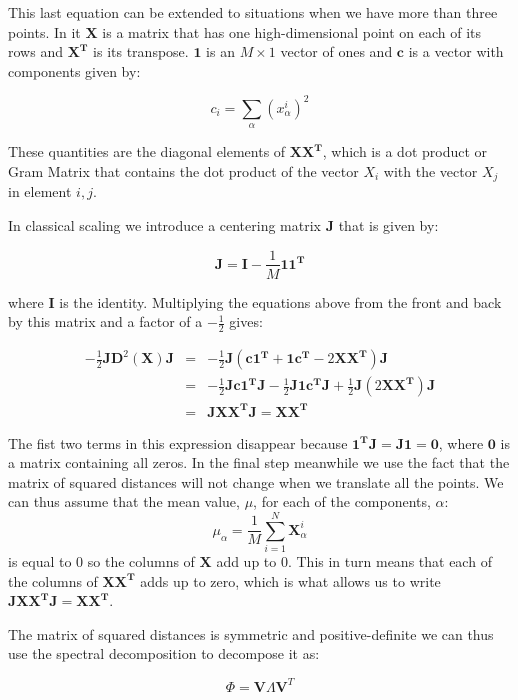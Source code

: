 This last equation can be extended to situations when we have more than three points. In it $\mathbf{X}$ is a matrix that has one high-\/dimensional point on each of its rows and $\mathbf{X^T}$ is its transpose. $\mathbf{1}$ is an $M \times 1$ vector of ones and $\mathbf{c}$ is a vector with components given by\+:

\[ c_i = \sum_\alpha (x_\alpha^i)^2 \]

These quantities are the diagonal elements of $\mathbf{X X^T}$, which is a dot product or Gram Matrix that contains the dot product of the vector $X_i$ with the vector $X_j$ in element $i,j$.

In classical scaling we introduce a centering matrix $\mathbf{J}$ that is given by\+:

\[ \mathbf{J} = \mathbf{I} - \frac{1}{M} \mathbf{11^T} \]

where $\mathbf{I}$ is the identity. Multiplying the equations above from the front and back by this matrix and a factor of a $-\frac{1}{2}$ gives\+:

\begin{eqnarray*} -\frac{1}{2} \mathbf{J} \mathbf{D}^2(\mathbf{X}) \mathbf{J} &=& -\frac{1}{2}\mathbf{J}( \mathbf{c 1^T} + \mathbf{1 c^T} - 2\mathbf{X X^T})\mathbf{J} \\ &=& -\frac{1}{2}\mathbf{J c 1^T J} - \frac{1}{2} \mathbf{J 1 c^T J} + \frac{1}{2} \mathbf{J}(2\mathbf{X X^T})\mathbf{J} \\ &=& \mathbf{ J X X^T J } = \mathbf{X X^T } \label{eqn:scaling} \end{eqnarray*}

The fist two terms in this expression disappear because $\mathbf{1^T J}=\mathbf{J 1} =\mathbf{0}$, where $\mathbf{0}$ is a matrix containing all zeros. In the final step meanwhile we use the fact that the matrix of squared distances will not change when we translate all the points. We can thus assume that the mean value, $\mu$, for each of the components, $\alpha$\+: \[ \mu_\alpha = \frac{1}{M} \sum_{i=1}^N \mathbf{X}^i_\alpha \] is equal to 0 so the columns of $\mathbf{X}$ add up to 0. This in turn means that each of the columns of $\mathbf{X X^T}$ adds up to zero, which is what allows us to write $\mathbf{ J X X^T J } = \mathbf{X X^T }$.

The matrix of squared distances is symmetric and positive-\/definite we can thus use the spectral decomposition to decompose it as\+:

\[ \Phi= \mathbf{V} \Lambda \mathbf{V}^T \]


